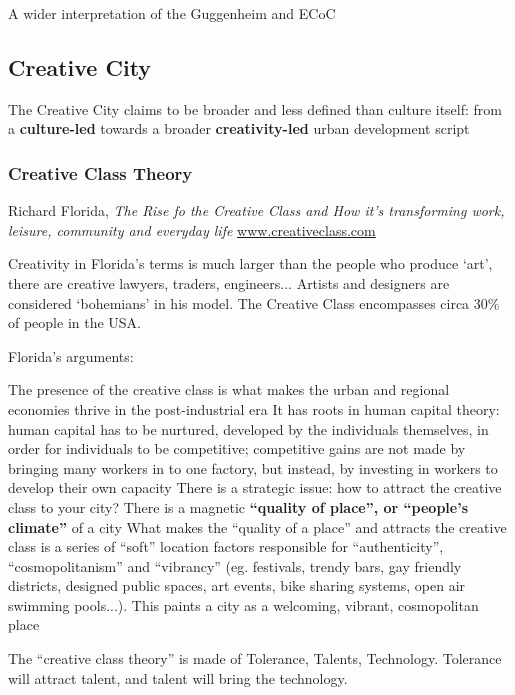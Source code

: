 \documentclass{article}
\begin{document}
A wider interpretation of the Guggenheim and ECoC

\subsection{Creative City}

The Creative City claims to be broader and less defined than culture itself: from a \textbf{culture-led} towards a broader \textbf{creativity-led} urban development script

\subsubsection{Creative Class Theory}

Richard Florida, \textit{The Rise fo the Creative Class and How it's transforming work, leisure, community and everyday life} \url{www.creativeclass.com}

Creativity in Florida's terms is much larger than the people who produce `art', there are creative lawyers, traders, engineers... Artists and designers are considered `bohemians' in his model. The Creative Class encompasses circa 30\% of people in the USA.

Florida's arguments:

\begin{outline}
	\1 The presence of the creative class is what makes the urban and regional economies thrive in the post-industrial era
		\2 It has roots in human capital theory: human capital has to be nurtured, developed by the individuals themselves, in order for individuals to be competitive; competitive gains are not made by bringing many workers in to one factory, but instead, by investing in workers to develop their own capacity
	\1 There is a strategic issue: how to attract the creative class to your city? There is a magnetic \textbf{``quality of place'', or ``people's climate''} of a city
		\2 What makes the ``quality of a place'' and attracts the creative class is a series of ``soft'' location factors responsible for ``authenticity'', ``cosmopolitanism'' and ``vibrancy'' (eg. festivals, trendy bars, gay friendly districts, designed public spaces, art events, bike sharing systems, open air swimming pools...). This paints a city as a welcoming, vibrant, cosmopolitan place
\end{outline}
		
The ``creative class theory'' is made of Tolerance, Talents, Technology. Tolerance will attract talent, and talent will bring the technology. 
\end{document}
